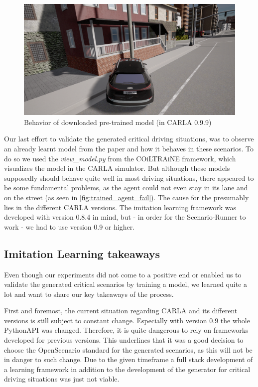 \documentclass[conference, a4paper, 11pt]{IEEEtran}
\begin{document}
\begin{figure}[ht]
    \centering
    \includegraphics[width=0.9\linewidth]{figures/trained_agent_fail.png}
    \caption{Behavior of downloaded pre-trained model (in CARLA 0.9.9)}
    \label{fig:trained_agent_fail}
\end{figure}

Our last effort to validate the generated critical driving situations, was to observe an already learnt model from the paper  \cite{Codevilla:OnOfflineEvaluation} and how it behaves in these scenarios. To do so we used the \textit{view\_model.py} from the COiLTRAiNE framework, which visualizes the model in the CARLA simulator. But although these models supposedly should behave quite well in most driving situations, there appeared to be some fundamental problems, as the agent could not even stay in its lane and on the street (as seen in \autoref{fig:trained_agent_fail}). The cause for the presumably lies in the different CARLA versions. The imitation learning framework was developed with version 0.8.4 in mind, but - in order for the Scenario-Runner to work - we had to use version 0.9 or higher.

\subsection{Imitation Learning takeaways}

Even though our experiments did not come to a positive end or enabled us to validate the generated critical scenarios by training a model, we learned quite a lot and want to share our key takeaways of the process.

First and foremost, the current situation regarding CARLA and its different versions is still subject to constant change. Especially with version 0.9 the whole PythonAPI was changed. Therefore, it is quite dangerous to rely on frameworks developed for previous versions. This underlines that it was a good decision to choose the OpenScenario standard for the generated scenarios, as this will not be in danger to such change.
Due to the given timeframe a full stack development of a learning framework in addition to the development of the generator for critical driving situations was just not viable.
\end{document}
